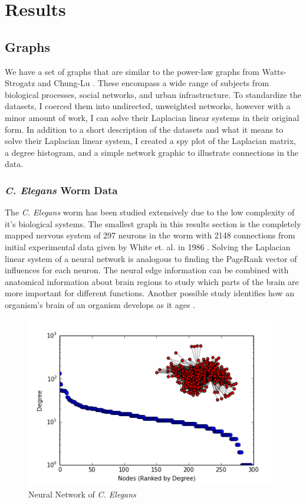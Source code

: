 \documentclass{article}
\begin{document}
\section{Results}
\subsection{Graphs}
We have a set of graphs that are similar to the power-law graphs from Watts-Strogatz and Chung-Lu \cite{Watts:1998,Chung:2004}. These encompass a wide range of subjects from biological processes, social networks, and urban infrastructure. To standardize the datasets, I coerced them into undirected, unweighted networks, however with a minor amount of work, I can solve their Laplacian linear systems in their original form. In addition to a short description of the datasets and what it means to solve their Laplacian linear system, I created a spy plot of the Laplacian matrix, a degree histogram, and a simple network graphic to illustrate connections in the data.
\subsubsection{\textit{C. Elegans} Worm Data}
The \textit{C. Elegans} worm has been studied extensively due to the low complexity of it's biological systems. The smallest graph in this results section is the completely mapped nervous system of 297 neurons in the worm with 2148 connections from initial experimental data given by White et. al. in 1986 \cite{White:1986,Watts:1998}. Solving the Laplacian linear system of a neural network is analogous to finding the PageRank vector of  influences for each neuron. The neural edge information can be combined with anatomical information about brain regions to study which parts of the brain are more important for different functions. Another possible study identifies how an organism's brain of an organism develops as it ages \cite{Gleich:2015}.

\begin{figure}
\centering

\includegraphics[width=\linewidth]{neural_degree_histogram.png}
\caption{Neural Network of \textit{C. Elegans}}
  
\end{figure}
\end{document}
